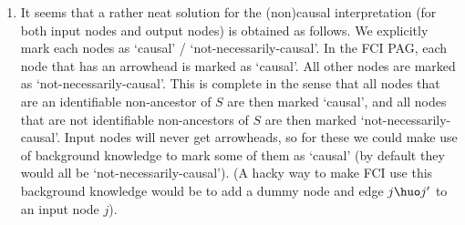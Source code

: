 {\begin{enumerate}
  \item It seems that a rather neat solution for the (non)causal interpretation (for both input nodes and output nodes) is obtained as follows.
    We explicitly mark each nodes as `causal' / `not-necessarily-causal'. 
    In the FCI PAG, each node that has an arrowhead is marked as `causal'.
    All other nodes are marked as `not-necessarily-causal'.
    This is complete in the sense that all nodes that are an identifiable non-ancestor of $S$ are then marked `causal', 
    and all nodes that are not identifiable non-ancestors of $S$ are then marked `not-necessarily-causal'.
    Input nodes will never get arrowheads, so for these we could make use of background knowledge to mark some of them as `causal' (by default they would all be `not-necessarily-causal').
    (A hacky way to make FCI use this background knowledge would be to add a dummy node and edge $j \huo j'$ to an input node $j$).


\end{enumerate}}
